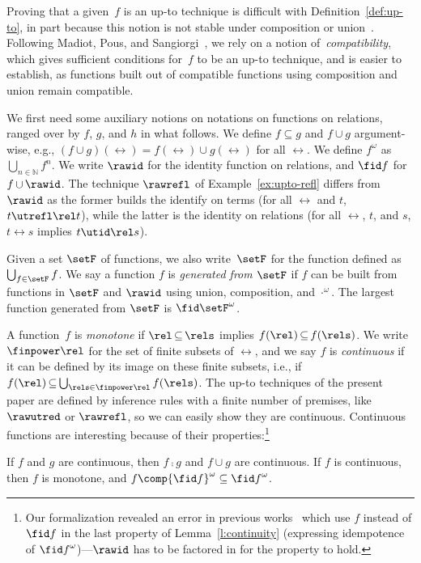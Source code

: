 \documentclass{lmcs}
\theoremstyle{defC}
\begin{document}
Proving that a given~$f$ is an up-to technique is difficult with
Definition~\ref{def:up-to}, in part because this notion is not stable under
composition or union~\cite{Madiot:PhD}. Following Madiot, Pous, and
Sangiorgi~\cite{Sangiorgi-Pous:11,Madiot-al:CONCUR14}, we rely on a notion
of~\emph{compatibility}, which gives sufficient conditions for~$f$ to be an
up-to technique, and is easier to establish, as functions built out of
compatible functions using composition and union remain compatible.

We first need some auxiliary notions on notations on functions on relations,
ranged over by $f$, $g$, and $h$ in what follows. We define $f \subseteq g$ and
$f \cup g$ argument-wise, e.g., $(f \cup g)(\rel)=f(\rel) \cup g(\rel)$ for all
$\rel$. We define $f^\omega$ as $\bigcup_{n \in \mathbb N} f^n$. We write
$\rawid$ for the identity function on relations, and $\fid f$ for
$f \mathop\cup \rawid$. The technique $\rawrefl$ of Example~\ref{ex:upto-refl}
differs from $\rawid$ as the former builds the identify on terms (for all $\rel$
and $t$, $t \utrefl\rel t$), while the latter is the identity on relations (for
all $\rel$, $t$, and $s$, $t \rel s$ implies $t \utid\rel s$).

Given a set $\setF$ of functions, we also write~$\setF$ for the function defined
as $\bigcup_{f \in \setF} f$. We say a function $f$ is \emph{generated from
  $\setF$} if $f$ can be built from functions in $\setF$ and $\rawid$ using
union, composition, and $\cdot^\omega$. The largest function generated from
$\setF$ is ${\fid \setF}^\omega$.

A function~$f$ is \emph{monotone} if $\rel \mathop\subseteq \rels$ implies
$f(\rel) \mathop\subseteq f(\rels)$.  We write $\finpower\rel$ for the set of
finite subsets of $\rel$, and we say $f$ is \emph{continuous} if it can be
defined by its image on these finite subsets, i.e., if
$f(\rel) \mathop\subseteq \bigcup_{\rels \in \finpower\rel}f(\rels)$. The up-to
techniques of the present paper are defined by inference rules with a finite
number of premises, like $\rawutred$ or $\rawrefl$, so we can easily show they
are continuous. Continuous functions are interesting because of their
properties:\footnote{Our formalization revealed an error in previous
  works~\cite{Aristizabal-al:FSCD16,Madiot:PhD} which use $f$ instead of
  $\fid f$ in the last property of Lemma~\ref{l:continuity} (expressing
  idempotence of ${\fid f}^\omega$)---$\rawid$ has to be factored in for the
  property to hold.}

\begin{lem}%
  \label{l:continuity}
  If $f$ and $g$ are continuous, then $f \comp g$ and $f \cup g$ are continuous.
  If $f$ is continuous, then $f$ is monotone, and $f \comp {\fid f}^\omega
  \subseteq {\fid f}^\omega$.
\end{lem}
\end{document}
